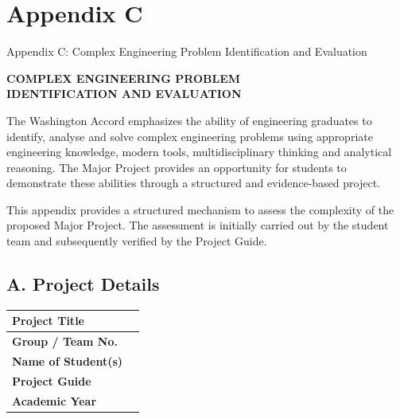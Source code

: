 
\chapter*{Appendix C}

{Appendix C: Complex Engineering Problem Identification and Evaluation}

\begin{center}
    {\Large\bfseries COMPLEX ENGINEERING PROBLEM}\\[0.15cm]
    {\Large\bfseries IDENTIFICATION AND EVALUATION}
\end{center}

\vspace{0.3cm}

\noindent
The Washington Accord emphasizes the ability of engineering graduates
to identify, analyse and solve complex engineering problems using
appropriate engineering knowledge, modern tools, multidisciplinary
thinking and analytical reasoning. The Major Project provides an
opportunity for students to demonstrate these abilities through a
structured and evidence-based project.

\vspace{0.25cm}

\noindent
This appendix provides a structured mechanism to assess the complexity
of the proposed Major Project. The assessment is initially carried out
by the student team and subsequently verified by the Project Guide.


\section*{A. Project Details}

\begin{center}
\renewcommand{\arraystretch}{1.4}

\begin{tabular}{|p{5cm}|p{9cm}|}
\hline
\textbf{Project Title} & \\[0.5cm]
\hline
\textbf{Group / Team No.} & \\[0.4cm]
\hline
\textbf{Name of Student(s)} & \\[0.7cm]
\hline
\textbf{Project Guide} & \\[0.4cm]
\hline
\textbf{Academic Year} & \\[0.4cm]
\hline
\end{tabular}

\end{center}

